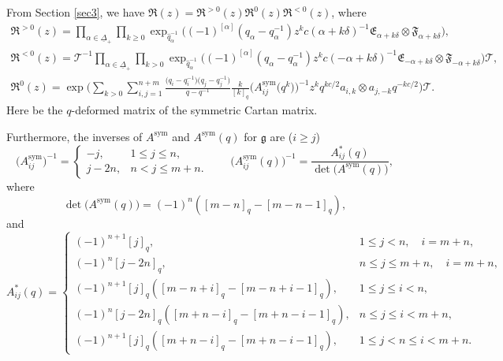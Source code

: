 \documentclass[10pt,a4paper]{amsart}
\numberwithin{equation}{section}
\begin{document}
From Section \ref{sec3}, we have
$\mathfrak{R}(z)=\mathfrak{R}^{>0}(z)\mathfrak{R}^{0}(z)\mathfrak{R}^{<0}(z)$,
where
\begin{gather*}
 \mathfrak{R}^{>0}(z)=\prod\limits_{\alpha\in\underline{\Delta}_{+} }\prod\limits_{k\geq0 }\exp_{\hat{q}_{\alpha}^{-1}}\bigl((-1)^{[\alpha]}(q_{\alpha}-q_{\alpha}^{-1})z^kc(\alpha+k\delta)^{-1}\mathfrak{E}_{\alpha+k\delta}\otimes \mathfrak{F}_{\alpha+k\delta}\bigr), \\
 \mathfrak{R}^{<0}(z)=\mathcal{T}^{-1}\prod\limits_{\alpha\in\underline{\Delta}_{+} }\prod\limits_{k>0 }\exp_{\hat{q}_{\alpha}^{-1}}\bigl((-1)^{[\alpha]}(q_{\alpha}-q_{\alpha}^{-1})z^kc(-\alpha+k\delta)^{-1}\mathfrak{E}_{-\alpha+k\delta}\otimes \mathfrak{F}_{-\alpha+k\delta}\bigr)\mathcal{T},
\\
 \mathfrak{R}^{0}(z)=\exp\Biggl(\sum\limits_{k>0}\sum\limits_{i,j=1}^{n+m}\frac{\bigl(q_i-q_i^{-1}\bigr)\bigl(q_j-q_j^{-1}\bigr)}{q-q^{-1}}
 \frac{k}{[k]_q}\bigl(A_{ij}^{\operatorname{sym}}\bigl(q^k\bigr)\bigr)^{-1}
 z^kq^{kc/2}
 a_{i,k}\otimes a_{j,-k}q^{-kc/2}\Biggr)\mathcal{T}.
\end{gather*}
Here  be the $q$-deformed matrix of the symmetric Cartan matrix.

Furthermore, the inverses of $A^{\operatorname{sym}}$ and $A^{\operatorname{sym}}(q)$ for $\mathfrak{g}$ are ($i\geq j$)
\begin{equation*}
 \bigl(A_{ij}^{\operatorname{sym}}\bigr)^{-1}=
 \begin{cases}
 -j,& 1\leq j\leq n,\\
 j-2n,& n< j\leq m+n.
 \end{cases}\qquad \bigl(A_{ij}^{\operatorname{sym}}(q)\bigr)^{-1}=\frac{A_{ij}^*(q)}{\operatorname{det}\bigl(A^{\operatorname{sym}}(q)\bigr)},
\end{equation*}
where
\begin{equation*}
 \operatorname{det}\bigl(A^{\operatorname{sym}}(q)\bigr)=(-1)^n([m-n]_q-[m-n-1]_q),
\end{equation*}
and
\begin{equation*}
 A_{ij}^*(q)=
 \begin{cases}
 (-1)^{n+1}[j]_q, & 1\leq j<n,\quad i=m+n,\\
 (-1)^n[j-2n]_q, & n\leq j\leq m+n,\quad i=m+n,\\
 (-1)^{n+1}[j]_q([m-n+i]_q-[m-n+i-1]_q), & 1\leq j\leq i<n,\\
 (-1)^n[j-2n]_q([m+n-i]_q-[m+n-i-1]_q), & n\leq j\leq i< m+n,\\
 (-1)^{n+1}[j]_q([m+n-i]_q-[m+n-i-1]_q), & 1\leq j<n\leq i< m+n.
 \end{cases}
\end{equation*}
\end{document}
